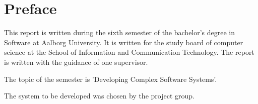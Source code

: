 \chapter*{Preface}
This report is written during the sixth semester of the bachelor's degree in Software at Aalborg University.
It is written for the study board of computer science at the School of Information and Communication Technology.
The report is written with the guidance of one supervisor.

The topic of the semester is 'Developing Complex Software Systems'.

The system to be developed was chosen by the project group.



\newpage
